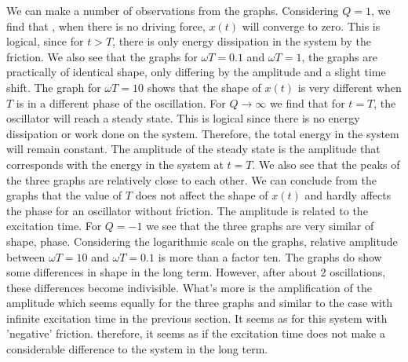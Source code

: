 We can make a number of observations from the graphs. Considering $Q = 1$, we find that , when there is no driving force, $x(t)$ will converge to zero. This is logical, since for $t>T$, there is only energy dissipation in the system by the friction. We also see that the graphs for $\omega T = 0.1$ and $\omega T =1$, the graphs are practically of identical shape, only differing by the amplitude and a slight time shift. The graph for $\omega T = 10$ shows that the shape of $x(t)$ is very different when $T$ is in a different phase of the oscillation. 
For $Q \rightarrow \infty$ we find that for $t=T$, the oscillator will reach a steady state. This is logical since there is no energy dissipation or work done on the system. Therefore, the total energy in the system will remain constant. The amplitude of the steady state is the amplitude that corresponds with the energy in the system at $t=T$. We also see that the peaks of the three graphs are relatively close to each other. We can conclude from the graphs that the value of $T$ does not affect the shape of $x(t)$ and hardly affects the phase for an oscillator without friction. The amplitude is related to the excitation time.
For $Q=-1$ we see that the three graphs are very similar of shape, phase. Considering the logarithmic scale on the graphs, relative amplitude between $\omega T = 10$ and $\omega T = 0.1$ is more than a factor ten. The graphs do show some differences in shape in the long term. However, after about 2 oscillations, these differences become indivisible. What's more is the amplification of the amplitude which seems equally for the three graphs and similar to the case with infinite excitation time in the previous section. It seems as for this system with 'negative' friction. therefore, it seems as if the excitation time does not make a considerable difference to the system in the long term. 
